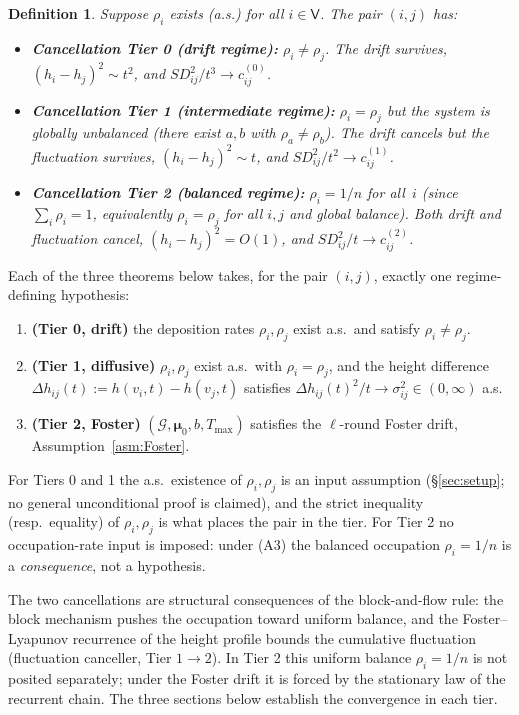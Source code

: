 \documentclass[11pt]{article}
\newtheorem{dfn}{Definition}
\theoremstyle{definition}
\begin{document}
\begin{dfn}
\label{dfn:regime}
Suppose $\rho_i$ exists (a.s.) for all $i\in \mathsf{V}$. The pair $(i,j)$ has:
\begin{itemize}
\item \textbf{Cancellation Tier 0 (drift regime):} $\rho_i\neq\rho_j$. The drift survives, $(h_i-h_j)^2\sim t^2$, and $SD^2_{ij}/t^3\to c^{(0)}_{ij}$.
\item \textbf{Cancellation Tier 1 (intermediate regime):} $\rho_i=\rho_j$ but the system is \emph{globally unbalanced} (there exist $a,b$ with $\rho_a\neq\rho_b$). The drift cancels but the fluctuation survives, $(h_i-h_j)^2\sim t$, and $SD^2_{ij}/t^2\to c^{(1)}_{ij}$.
\item \textbf{Cancellation Tier 2 (balanced regime):} $\rho_i=1/n$ for all~$i$ (since $\sum_i\rho_i=1$, equivalently $\rho_i=\rho_j$ for all $i,j$ \emph{and} global balance). Both drift and fluctuation cancel, $(h_i-h_j)^2=O(1)$, and $SD^2_{ij}/t\to c^{(2)}_{ij}$.
\end{itemize}
\end{dfn}

Each of the three theorems below takes, for the pair $(i, j)$, exactly one regime-defining hypothesis:
\begin{enumerate}[label=\textnormal{(A\arabic*)}, leftmargin=2.5em]
  \item \textbf{(Tier 0, drift)} the deposition rates $\rho_i, \rho_j$ exist a.s.\ and satisfy $\rho_i \neq \rho_j$.
  \item \textbf{(Tier 1, diffusive)} $\rho_i, \rho_j$ exist a.s.\ with $\rho_i = \rho_j$, and the height difference $\Delta h_{ij}(t) := h(v_i, t) - h(v_j, t)$ satisfies $\Delta h_{ij}(t)^2 / t \to \sigma^2_{ij} \in (0, \infty)$ a.s.
  \item \textbf{(Tier 2, Foster)} $(\mathcal{G}, \boldsymbol{\mu}_0, b, T_{\max})$ satisfies the $\ell$-round Foster drift, Assumption~\ref{asm:Foster}.
\end{enumerate}
For Tiers 0 and 1 the a.s.\ existence of $\rho_i, \rho_j$ is an input assumption (\S\ref{sec:setup}; no general unconditional proof is claimed), and the strict inequality (resp.\ equality) of $\rho_i, \rho_j$ is what places the pair in the tier. For Tier 2 no occupation-rate input is imposed: under (A3) the balanced occupation $\rho_i = 1/n$ is a \emph{consequence}, not a hypothesis.

The two cancellations are structural consequences of the block-and-flow rule: the block mechanism pushes the occupation toward uniform balance, and the Foster--Lyapunov recurrence of the height profile bounds the cumulative fluctuation (fluctuation canceller, Tier $1\to2$). In Tier 2 this uniform balance $\rho_i = 1/n$ is not posited separately; under the Foster drift it is forced by the stationary law of the recurrent chain. The three sections below establish the convergence in each tier.
\end{document}
